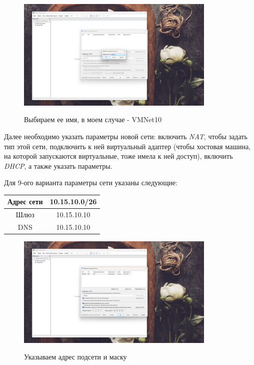 \documentclass[a4paper]{article}
\begin{document}
  \begin{figure}[H]
    \centering
    \includegraphics[width=0.85\textwidth]{06_00 (4)}
    \label{img:4}
    \caption{Выбираем ее имя, в моем случае - VMNet10}
  \end{figure}
  
  Далее необходимо указать параметры новой сети: включить \textit{NAT},
  чтобы задать тип этой сети, подключить к ней виртуальный адаптер (чтобы хостовая машина,
  на которой запускаются виртуальные, тоже имела к ней доступ), включить \textit{DHCP},
  а также указать параметры.

  Для 9-ого варианта параметры сети указаны следующие:
  \begin{table}[H]
    \centering
    \begin{tabular}{|c|c|}
      \hline
      Адрес сети & 10.15.10.0/26 \\
      \hline
      Шлюз & 10.15.10.10 \\
      \hline
      DNS & 10.15.10.10 \\
      \hline      
    \end{tabular}
  \end{table}

  \begin{figure}[H]
    \centering
    \includegraphics[width=0.85\textwidth]{06_00 (5)}
    \label{img:5}
    \caption{Указываем адрес подсети и маску}
  \end{figure}
  
\end{document}
